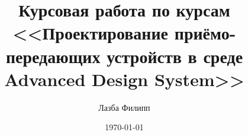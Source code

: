 \documentclass[a4paper,12pt]{report}
\author{Лазба Филипп}
\title{Курсовая работа по курсам <<Проектирование приёмо-передающих устройств в среде Advanced Design System>>}
\date{\today}
\begin{document}
	
	\tableofcontents{}
	
	
	
	
	
	
	
	
	
	
	
	
\end{document}
